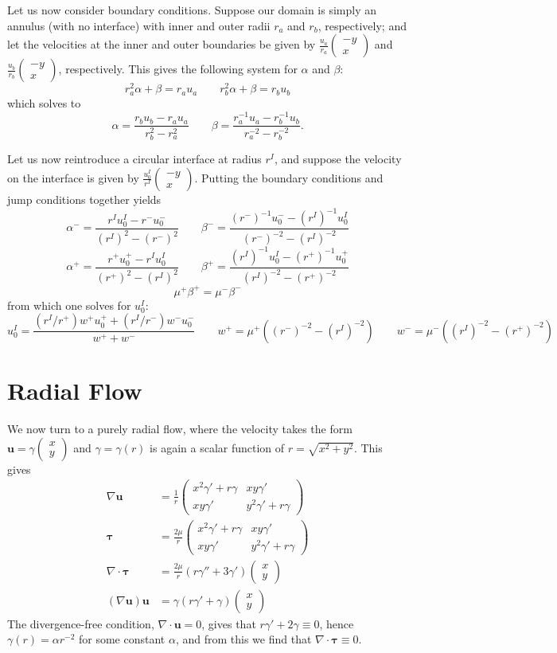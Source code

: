 \documentclass{article}
\newcommand{\q}{\quad\quad}
\newcommand{\uu}{\mathbf{u}}
\renewcommand{\uu}{\mathbf{u}}
\newcommand{\ta}{\pmb{\tau}}
\newcommand{\mx}[1]{\begin{pmatrix} #1 \end{pmatrix}}
\begin{document}
Let us now consider boundary conditions.  Suppose our domain is simply an annulus (with no interface) with inner and outer radii $r_a$ and $r_b$, respectively; and let the velocities at the inner and outer boundaries be given by $\frac{u_a}{r_a} \mx{-y \\ x}$ and $\frac{u_b}{r_b} \mx{-y \\ x}$, respectively.  This gives the following system for $\alpha$ and $\beta$:
$$ r_a^2 \alpha + \beta = r_a u_a \q r_b^2 \alpha + \beta = r_b u_b $$
which solves to
$$ \alpha = \frac{r_b u_b - r_a u_a}{r_b^2 - r_a^2} \q \beta = \frac{r_a^{-1} u_a - r_b^{-1} u_b}{r_a^{-2} - r_b^{-2}}. $$

Let us now reintroduce a circular interface at radius $r^I$, and suppose the velocity on the interface is given by $\frac{u^I_0}{r^I} \mx{-y \\ x}$.  Putting the boundary conditions and jump conditions together yields
$$ \alpha^- = \frac{r^I u^I_0 - r^- u^-_0}{(r^I)^2 - (r^-)^2} \q \beta^- = \frac{(r^-)^{-1} u^-_0 - (r^I)^{-1} u^I_0}{(r^-)^{-2} - (r^I)^{-2}} $$
$$ \alpha^+ = \frac{r^+ u^+_0 - r^I u^I_0}{(r^+)^2 - (r^I)^2} \q \beta^+ = \frac{(r^I)^{-1} u^I_0 - (r^+)^{-1} u^+_0}{(r^I)^{-2} - (r^+)^{-2}} $$
$$ \mu^+ \beta^+ = \mu^- \beta^- $$
from which one solves for $u^I_0$:
$$ u^I_0 = \frac{(r^I/r^+) w^+ u^+_0 + (r^I/r^-) w^- u^-_0}{w^+ + w^-} \q w^+ = \mu^+ \left( (r^-)^{-2} - (r^I)^{-2} \right) \q w^- = \mu^- \left( (r^I)^{-2} - (r^+)^{-2} \right) $$

\section{Radial Flow}

We now turn to a purely radial flow, where the velocity takes the form $\uu = \gamma \mx{x \\ y}$ and $\gamma = \gamma(r)$ is again a scalar function of $r = \sqrt{x^2 + y^2}$.  This gives
\begin{align}
\nabla \uu & = \frac{1}{r} \mx{x^2 \gamma' + r \gamma & xy \gamma' \\ xy \gamma' & y^2 \gamma' + r \gamma} \\
\ta & = \frac{2\mu}{r} \mx{x^2 \gamma' + r \gamma & xy \gamma' \\ xy \gamma' & y^2 \gamma' + r \gamma} \\
\nabla \cdot \ta & = \frac{2\mu}{r} \left( r \gamma'' + 3 \gamma' \right) \mx{x \\ y} \\
\left( \nabla \uu \right) \uu & = \gamma \left( r \gamma' + \gamma \right) \mx{x \\ y}
\end{align}
The divergence-free condition, $\nabla \cdot \uu = 0$, gives that $r \gamma' + 2 \gamma \equiv 0$, hence $\gamma(r) = \alpha r^{-2}$ for some constant $\alpha$, and from this we find that $\nabla \cdot \ta \equiv 0$.
\end{document}

